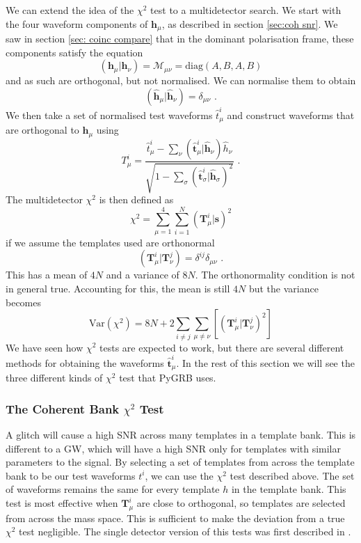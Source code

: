 \documentclass[11pt]{cuthesis}
\newcommand{\mn}{_{\mu\nu}}
\newcommand{\fs}{\text{ .}}
\begin{document}
We can extend the idea of the $\chi^2$ test to a multidetector search. We start with the four waveform components of $\textbf{h}_\mu$, as described in section \ref{sec:coh snr}. We saw in section \ref{sec: coinc compare} that in the dominant polarisation frame, these components satisfy the equation
\begin{equation}
( \textbf{h}_\mu | \textbf{h}_\nu ) = \mathcal{M}\mn = \text{diag}(A,B,A,B)
\end{equation}
and as such are orthogonal, but not normalised. We can normalise them to obtain 
\begin{equation}
(\hat{\textbf{h}}_\mu |\hat{\textbf{h}}_\nu ) = \delta\mn \fs
\end{equation}
We then take a set of normalised test waveforms $\hat{t}^i_\mu$ and construct waveforms that are orthogonal to $\hat{\textbf{h}}_\mu$ using
\begin{equation}
T^i_\mu = \frac{\hat{t}^i_\mu - \sum_\nu(\hat{\textbf{t}}^i_\mu | \hat{\textbf{h}}_\nu)\hat{h}_\nu}{\sqrt{1-\sum_\sigma(\hat{\textbf{t}}^i_\sigma|\hat{\textbf{h}}_\sigma)^2}} \fs
\end{equation}
The multidetector $\chi^2$ is then defined as
\begin{equation} \label{coh chisq}
\chi^2 = \sum_{\mu=1}^4 \sum_{i=1}^N (\textbf{T}^i_\mu | \textbf{s})^2 
\end{equation}
if we assume the templates used are orthonormal
\begin{equation}
( \textbf{T}^i_\mu | \textbf{T}^j_\nu ) = \delta^{ij}\delta\mn \fs
\end{equation}
This has a mean of $4N$ and a variance of $8N$. The orthonormality condition is not in general true. Accounting for this, the mean is still $4N$ but the variance becomes
\begin{equation} \label{coh chisq var}
\text{Var}(\chi^2) = 8N + 2\sum_{i \neq j} \sum_{\mu\neq\nu} [(\textbf{T}^i_\mu | \textbf{T}^j_\nu)^2 ] 
\end{equation}
We have seen how $\chi^2$ tests are expected to work, but there are several different methods for obtaining the waveforms $\hat{\textbf{t}}^i_\mu$. In the rest of this section we will see the three different kinds of $\chi^2$ test that PyGRB uses.


\subsubsection{The Coherent Bank $\chi^2$ Test}
A glitch will cause a high SNR across many templates in a template bank. This is different to a GW, which will have a high SNR only for templates with similar parameters to the signal. By selecting a set of templates from across the template bank to be our test waveforms $t^i$, we can use the $\chi^2$ test described above. The set of waveforms remains the same for every template $h$ in the template bank. This test is most effective when $\textbf{T}^i_\mu$ are close to orthogonal, so templates are selected from across the mass space. This is sufficient to make the deviation from a true $\chi^2$ test negligible. The single detector version of this tests was first described in \cite{hanna-thesis}.  
\end{document}
